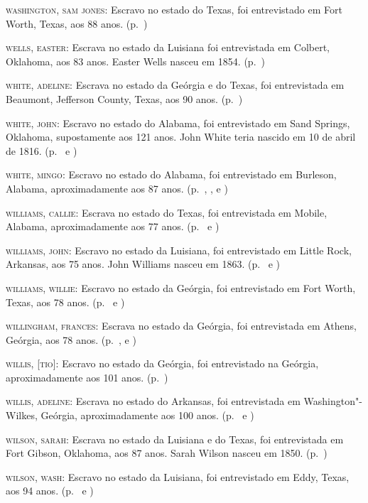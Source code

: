 \begin{Parskip}
\textsc{washington, sam jones:} Escravo no estado do Texas, foi
entrevistado em Fort Worth, Texas, aos 88 anos. (p.~\pageref{ref280})

\textsc{wells, easter:} Escrava no estado da Luisiana foi entrevistada
em Colbert, Oklahoma, aos 83 anos. Easter Wells nasceu em 1854. (p.~\pageref{ref281})

\textsc{white, adeline:} Escrava no estado da Geórgia e do Texas, foi
entrevistada em Beaumont, Jefferson County, Texas, aos 90 anos. (p.~\pageref{ref282})

\textsc{white, john:} Escravo no estado do Alabama, foi entrevistado em
Sand Springs, Oklahoma, supostamente aos 121 anos. John White teria
nascido em 10 de abril de 1816. (p.~\pageref{ref283} e \pageref{ref284})

\textsc{white, mingo:} Escravo no estado do Alabama, foi entrevistado em
Burleson, Alabama, aproximadamente aos 87 anos. (p.~\pageref{ref285}, \pageref{ref286}, \pageref{ref287} e \pageref{ref288})

\textsc{williams, callie:} Escrava no estado do Texas, foi entrevistada
em Mobile, Alabama, aproximadamente aos 77 anos. (p.~\pageref{ref289} e \pageref{ref290})

\textsc{williams, john:} Escravo no estado da Luisiana, foi entrevistado
em Little Rock, Arkansas, aos 75 anos. John Williams nasceu em 1863. (p.~\pageref{ref291} e \pageref{ref292})

\textsc{williams, willie:} Escravo no estado da Geórgia, foi
entrevistado em Fort Worth, Texas, aos 78 anos. (p.~\pageref{ref293} e \pageref{ref294})

\textsc{willingham, frances:} Escrava no estado da Geórgia, foi
entrevistada em Athens, Geórgia, aos 78 anos. (p.~\pageref{ref295}, \pageref{ref296} e \pageref{ref297})

\textsc{willis, {[}tio{]}:} Escravo no estado da Geórgia, foi entrevistado na
Geórgia, aproximadamente aos 101 anos. (p.~\pageref{ref323})

\textsc{willis, adeline:} Escrava no estado do Arkansas, foi
entrevistada em Washington"-Wilkes, Geórgia, aproximadamente aos 100
anos. (p.~\pageref{ref298} e \pageref{ref299})

\textsc{wilson, sarah:} Escrava no estado da Luisiana e do Texas, foi
entrevistada em Fort Gibson, Oklahoma, aos 87 anos. Sarah Wilson nasceu
em 1850. (p.~\pageref{ref300})

\textsc{wilson, wash:} Escravo no estado da Luisiana, foi entrevistado em
Eddy, Texas, aos 94 anos. (p.~\pageref{ref301} e \pageref{ref302})


\end{Parskip}
